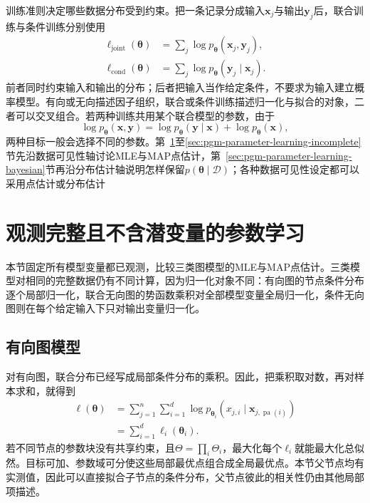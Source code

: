 训练准则决定哪些数据分布受到约束。把一条记录分成输入$\bm{x}_j$与输出$\bm{y}_j$后，联合训练与条件训练分别使用
\[
  \begin{aligned}
    \ell_{\mathrm{joint}}(\bm{\theta})
      &=\sum_j\log p_{\bm{\theta}}(\bm{x}_j,\bm{y}_j),\\
    \ell_{\mathrm{cond}}(\bm{\theta})
      &=\sum_j\log p_{\bm{\theta}}(\bm{y}_j\mid\bm{x}_j).
  \end{aligned}
\]
前者同时约束输入和输出的分布；后者把输入当作给定条件，不要求为输入建立概率模型。有向或无向描述因子组织，联合或条件训练描述归一化与拟合的对象，二者可以交叉组合。若两种训练共用某个联合模型的参数，由于
\[
  \log p_{\bm{\theta}}(\bm{x},\bm{y})
  =\log p_{\bm{\theta}}(\bm{y}\mid\bm{x})
   +\log p_{\bm{\theta}}(\bm{x}),
\]
两种目标一般会选择不同的参数。第~\ref{sec:pgm-parameter-learning-complete}至\ref{sec:pgm-parameter-learning-incomplete}节先沿数据可见性轴讨论MLE与MAP点估计，第~\ref{sec:pgm-parameter-learning-bayesian}节再沿分布估计轴说明怎样保留$p(\bm{\theta}\mid\mathcal{D})$；各种数据可见性设定都可以采用点估计或分布估计

\section{观测完整且不含潜变量的参数学习}
\label{sec:pgm-parameter-learning-complete}

本节固定所有模型变量都已观测，比较三类图模型的MLE与MAP点估计。三类模型对相同的完整数据仍有不同计算，因为归一化对象不同：有向图的节点条件分布逐个局部归一化，联合无向图的势函数乘积对全部模型变量全局归一化，条件无向图则在每个给定输入下只对输出变量归一化。

\subsection{有向图模型}
\label{sec:pgm-parameter-learning-directed}

对有向图，联合分布已经写成局部条件分布的乘积。因此，把乘积取对数，再对样本求和，就得到
\begin{equation}
  \begin{aligned}
    \ell(\bm{\theta})
      &=\sum_{j=1}^n\sum_{i=1}^d
        \log p_{\bm{\theta}_i}
        (x_{j,i}\mid\bm{x}_{j,\operatorname{pa}(i)})\\
      &=\sum_{i=1}^d\ell_i(\bm{\theta}_i).
  \end{aligned}
  \label{eq:pgm-parameter-learning-dag-likelihood}
\end{equation}
若不同节点的参数块没有共享约束，且$\Theta=\prod_i\Theta_i$，最大化每个$\ell_i$就能最大化总似然。目标可加、参数域可分使这些局部最优点组合成全局最优点。本节父节点均有实测值，因此可以直接拟合子节点的条件分布，父节点彼此的相关性仍由其他局部项描述。

